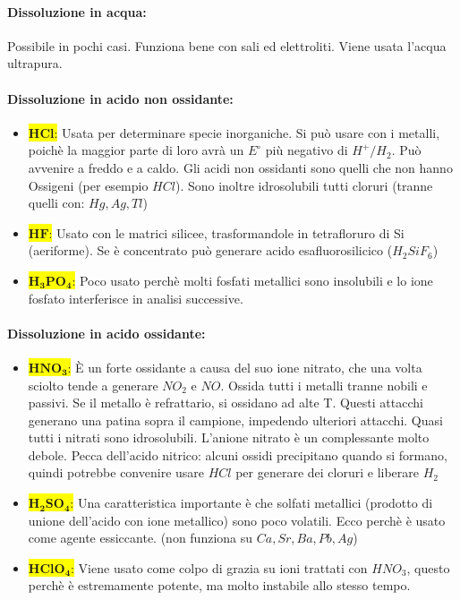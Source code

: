 \documentclass{article}
\begin{document}
\paragraph{Dissoluzione in acqua:} Possibile in pochi casi. Funziona bene con sali ed elettroliti. Viene usata l'acqua ultrapura.
\paragraph{Dissoluzione in acido non ossidante:} 

\begin{itemize}
	\item \colorbox{yellow}{{$\mathbf{HCl}$}:} Usata per determinare specie inorganiche. Si può usare con i metalli, poichè la maggior parte di loro avrà un $E^{\circ}$ più negativo di $H^+ / H_2$. Può avvenire a freddo e a caldo. Gli acidi non ossidanti sono quelli che non hanno Ossigeni (per esempio $HCl$). Sono inoltre idrosolubili tutti cloruri (tranne quelli con: $Hg, Ag, Tl$)
	\item \colorbox{yellow}{{$\mathbf{HF}$}:} Usato con le matrici silicee, trasformandole in tetrafloruro di Si (aeriforme). Se è concentrato può generare acido esafluorosilicico ($H_2SiF_6$)
	\item \colorbox{yellow}{{$\mathbf{H_3PO_4}$}:} Poco usato perchè molti fosfati metallici sono insolubili e lo ione fosfato interferisce in analisi successive.
\end{itemize}

\paragraph{Dissoluzione in acido ossidante:} 
\begin{itemize}
	\item \colorbox{yellow}{{$\mathbf{HNO_3}$}:} È un forte ossidante a causa del suo ione nitrato, che una volta sciolto tende a generare $NO_2$ e $NO$. Ossida tutti i metalli tranne nobili e passivi. Se il metallo è refrattario, si ossidano ad alte T. Questi attacchi generano una patina sopra il campione, impedendo ulteriori attacchi. Quasi tutti i nitrati sono idrosolubili. L'anione nitrato è un complessante molto debole. Pecca dell'acido nitrico: alcuni ossidi precipitano quando si formano, quindi potrebbe convenire usare $HCl$ per generare dei cloruri e liberare $H_2$ 
	\item \colorbox{yellow}{{$\mathbf{H_2SO_4}$}:} Una caratteristica importante è che solfati metallici (prodotto di unione dell'acido con ione metallico) sono poco volatili. Ecco perchè è usato come agente essiccante. (non funziona su $Ca, Sr, Ba, Pb, Ag$)
	\item \colorbox{yellow}{{$\mathbf{HClO_4}$}:} Viene usato come colpo di grazia su ioni trattati con $HNO_3$, questo perchè è estremamente potente, ma molto instabile allo stesso tempo.
\end{itemize}
\end{document}
